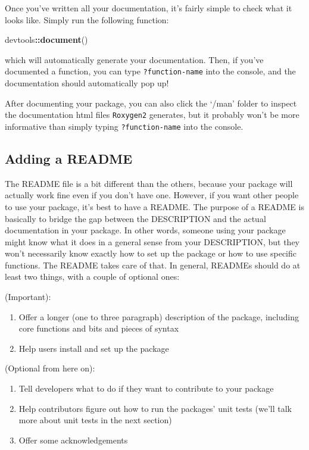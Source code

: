 \documentclass[]{book}
\newenvironment{Shaded}{\begin{snugshade}}{\end{snugshade}}
\newcommand{\KeywordTok}[1]{\textcolor[rgb]{0.13,0.29,0.53}{\textbf{#1}}}
\newcommand{\OperatorTok}[1]{\textcolor[rgb]{0.81,0.36,0.00}{\textbf{#1}}}
\newcommand{\NormalTok}[1]{#1}
\providecommand{\tightlist}{%
  \setlength{\itemsep}{0pt}\setlength{\parskip}{0pt}}
\begin{document}
Once you've written all your documentation, it's fairly simple to check
what it looks like. Simply run the following function:

\begin{Shaded}
\begin{Highlighting}[]
\NormalTok{devtools}\OperatorTok{::}\KeywordTok{document}\NormalTok{()}
\end{Highlighting}
\end{Shaded}

which will automatically generate your documentation. Then, if you've
documented a function, you can type \texttt{?function-name} into the
console, and the documentation should automatically pop up!

After documenting your package, you can also click the `/man' folder to
inspect the documentation html files \texttt{Roxygen2} generates, but it
probably won't be more informative than simply typing
\texttt{?function-name} into the console.

\subsection{Adding a README}\label{adding-a-readme}

The README file is a bit different than the others, because your package
will actually work fine even if you don't have one. However, if you want
other people to use your package, it's best to have a README. The
purpose of a README is basically to bridge the gap between the
DESCRIPTION and the actual documentation in your package. In other
words, someone using your package might know what it does in a general
sense from your DESCRIPTION, but they won't necessarily know exactly how
to set up the package or how to use specific functions. The README takes
care of that. In general, READMEs should do at least two things, with a
couple of optional ones:

(Important):

\begin{enumerate}
\def\labelenumi{\arabic{enumi}.}
\tightlist
\item
  Offer a longer (one to three paragraph) description of the package,
  including core functions and bits and pieces of syntax
\item
  Help users install and set up the package
\end{enumerate}

(Optional from here on):

\begin{enumerate}
\def\labelenumi{\arabic{enumi}.}
\setcounter{enumi}{2}
\tightlist
\item
  Tell developers what to do if they want to contribute to your package
\item
  Help contributors figure out how to run the packages' unit tests
  (we'll talk more about unit tests in the next section)
\item
  Offer some acknowledgements
\end{enumerate}
\end{document}
